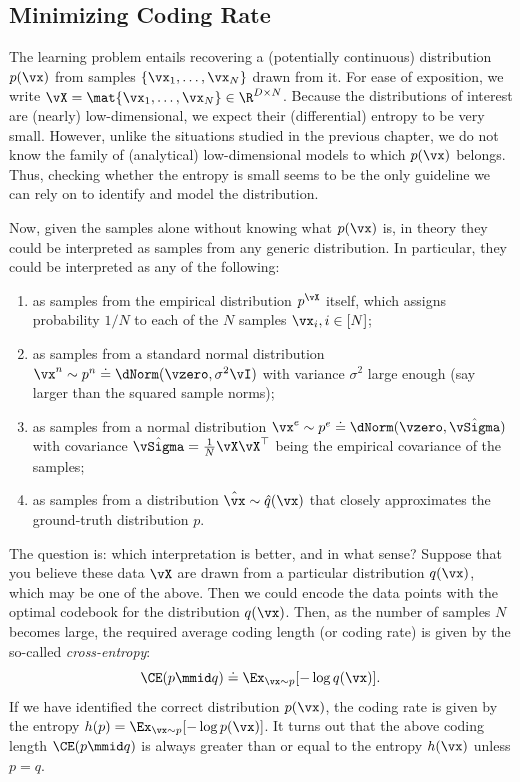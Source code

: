 \documentclass[../../book-main.tex]{subfiles}
\begin{document}
\subsection{Minimizing Coding Rate}\label{sub:min_entropy}
The learning problem entails recovering a (potentially continuous)
distribution \(p(\vx)\) from samples \(\{\vx_{1}, \dots, \vx_{N}\}\)
drawn from it. For ease of exposition, we write \(\vX = \mat{\vx_{1},
\dots, \vx_{N}} \in \R^{D \times N}\). Because the distributions of
interest are (nearly) low-dimensional, we expect their (differential)
entropy to be very small. However, unlike the situations studied in
the previous chapter, we do not know the family of (analytical)
low-dimensional models to which \(p(\vx)\) belongs. Thus, checking
whether the entropy is small seems to be the only guideline we can
rely on to identify and model the distribution.

Now, given the samples alone without knowing what \(p(\vx)\) is, in
theory they could be interpreted as samples from any generic
distribution. In particular, they could be interpreted as any of the following:
\begin{enumerate}
    \item as samples from the empirical distribution \(p^{\vX}\)
        itself, which assigns probability \(1/N\) to each of the
        \(N\) samples \(\vx_{i}, i \in [N]\);
    \item as samples from a standard normal distribution \(\vx^{n}
        \sim p^{n} \doteq \dNorm(\vzero, \sigma^{2} \vI)\) with
        variance \(\sigma^{2}\) large enough (say larger than the
        squared sample norms);
    \item as samples from a normal distribution \(\vx^{e} \sim p^{e}
        \doteq \dNorm(\vzero, \hat{\vSigma})\) with covariance
        \(\hat{\vSigma} = \frac{1}{N} \vX \vX^{\top}\) being the
        empirical covariance of the samples;
    \item as samples from a distribution \(\hat{\vx} \sim
        \hat{q}(\vx)\) that closely approximates the ground-truth
        distribution \(p\).
\end{enumerate}
The question is: which interpretation is better, and in what sense? Suppose
that you believe these data \(\vX\) are drawn from a particular
distribution \(q(\vx)\), which may be one of the above. Then we could
encode the data points with the optimal codebook for the distribution
\(q(\vx)\). Then, as the number of samples \(N\) becomes large, the
required average coding length (or coding rate) is given by the
so-called \textit{cross-entropy}:
\begin{equation}
    \CE(p \mmid q) \doteq \Ex_{\vx \sim p}[-\log q(\vx)].
\end{equation}
If we have identified
the correct distribution \(p(\vx)\), the coding rate is given by the
entropy \(h(p) = \Ex_{\vx \sim p}[-\log p(\vx)]\). It turns out
that the above coding length \(\CE(p \mmid q)\) is always greater than
or equal to the entropy \(h(\vx)\) unless \(p = q\).
\end{document}
